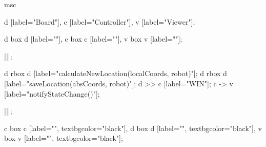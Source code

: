 \begin{msc}
msc
{

d [label="Board"],
c [label="Controller"],
v [label="Viewer"];

d box d [label=""],
c box c [label=""],
v box v [label=""];

|||;

d rbox d [label="calculateNewLocation(localCoords, robot)"];
d rbox d [label="saveLocation(absCoords, robot)"];
d >> c [label="WIN"];
c -> v [label="notifyStateChange()"];

|||;

c box c [label="", textbgcolor="black"],
d box d [label="", textbgcolor="black"],
v box v [label="", textbgcolor="black"];

}
\end{msc}
